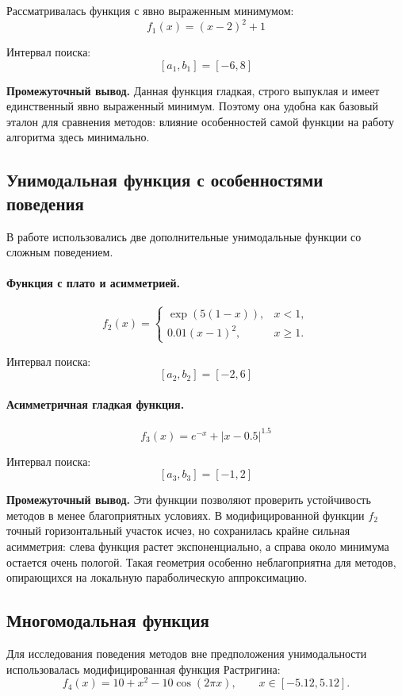 \documentclass[14pt,a4paper]{extarticle}
\begin{document}
Рассматривалась функция с явно выраженным минимумом:
\[
f_1(x) = (x - 2)^2 + 1
\]

Интервал поиска:
\[
[a_1, b_1] = [-6, 8]
\]

\textbf{Промежуточный вывод.} Данная функция гладкая, строго выпуклая и имеет единственный явно выраженный минимум. Поэтому она удобна как базовый эталон для сравнения методов: влияние особенностей самой функции на работу алгоритма здесь минимально.

\subsection{Унимодальная функция с особенностями поведения}

В работе использовались две дополнительные унимодальные функции со сложным поведением.

\paragraph{Функция с плато и асимметрией.}
\[
f_2(x)=
\begin{cases}
\exp(5(1-x)), & x < 1, \\
0.01(x-1)^2, & x \ge 1.
\end{cases}
\]

Интервал поиска:
\[
[a_2, b_2] = [-2, 6]
\]

\paragraph{Асимметричная гладкая функция.}
\[
f_3(x) = e^{-x} + |x - 0.5|^{1.5}
\]

Интервал поиска:
\[
[a_3, b_3] = [-1, 2]
\]

\textbf{Промежуточный вывод.} Эти функции позволяют проверить устойчивость методов в менее благоприятных условиях. В модифицированной функции $f_2$ точный горизонтальный участок исчез, но сохранилась крайне сильная асимметрия: слева функция растет экспоненциально, а справа около минимума остается очень пологой. Такая геометрия особенно неблагоприятна для методов, опирающихся на локальную параболическую аппроксимацию.

\subsection{Многомодальная функция}

Для исследования поведения методов вне предположения унимодальности использовалась модифицированная функция Растригина:
\[
f_4(x) = 10 + x^2 - 10\cos(2\pi x), \qquad x \in [-5.12, 5.12].
\]
\end{document}
